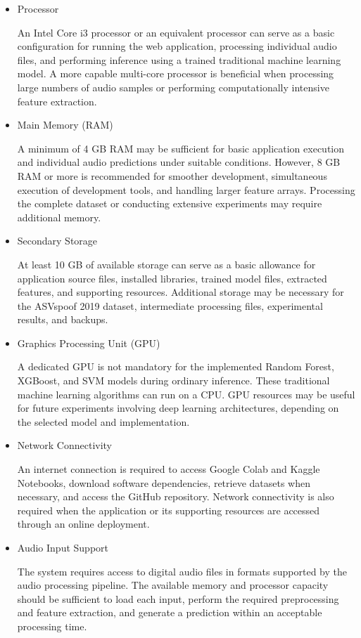 \documentclass[12pt,a4paper]{report}
\begin{document}
\begin{itemize}

    \item Processor

    An Intel Core i3 processor or an equivalent processor can serve as a basic configuration for running the web application, processing individual audio files, and performing inference using a trained traditional machine learning model. A more capable multi-core processor is beneficial when processing large numbers of audio samples or performing computationally intensive feature extraction.

    \item Main Memory (RAM)

    A minimum of 4 GB RAM may be sufficient for basic application execution and individual audio predictions under suitable conditions. However, 8 GB RAM or more is recommended for smoother development, simultaneous execution of development tools, and handling larger feature arrays. Processing the complete dataset or conducting extensive experiments may require additional memory.

    \item Secondary Storage

    At least 10 GB of available storage can serve as a basic allowance for application source files, installed libraries, trained model files, extracted features, and supporting resources. Additional storage may be necessary for the ASVspoof 2019 dataset, intermediate processing files, experimental results, and backups.

    \item Graphics Processing Unit (GPU)

    A dedicated GPU is not mandatory for the implemented Random Forest, XGBoost, and SVM models during ordinary inference. These traditional machine learning algorithms can run on a CPU. GPU resources may be useful for future experiments involving deep learning architectures, depending on the selected model and implementation.

    \item Network Connectivity

    An internet connection is required to access Google Colab and Kaggle Notebooks, download software dependencies, retrieve datasets when necessary, and access the GitHub repository. Network connectivity is also required when the application or its supporting resources are accessed through an online deployment.

    \item Audio Input Support

    The system requires access to digital audio files in formats supported by the audio processing pipeline. The available memory and processor capacity should be sufficient to load each input, perform the required preprocessing and feature extraction, and generate a prediction within an acceptable processing time.

\end{itemize}
\end{document}
